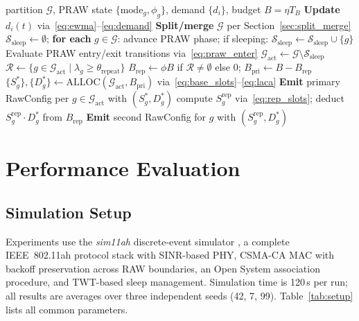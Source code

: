 \documentclass[conference]{IEEEtran}
\begin{document}
\begin{algorithm}[!t]
\caption{TRAW: per-beacon adaptation}
\label{alg:traw}
\begin{algorithmic}[1]
\Require partition $\mathcal{G}$, PRAW state $\{\mathrm{mode}_g, \phi_g\}$,
         demand $\{d_i\}$, budget $B\!=\!\eta T_B$
\State \textbf{Update} $d_i(t)$ via~\eqref{eq:ewma}--\eqref{eq:demand}
\State \textbf{Split/merge} $\mathcal{G}$ per Section~\ref{sec:split_merge}
\State $\mathcal{S}_\mathrm{sleep}\!\leftarrow\!\emptyset$;
  \textbf{for each} $g\in\mathcal{G}$:
  advance PRAW phase; if sleeping: $\mathcal{S}_\mathrm{sleep}\!\leftarrow\!\mathcal{S}_\mathrm{sleep}\cup\{g\}$
\State Evaluate PRAW entry/exit transitions via~\eqref{eq:praw_enter}
\State $\mathcal{G}_\mathrm{act}\!\leftarrow\!\mathcal{G}\setminus\mathcal{S}_\mathrm{sleep}$
\State $\mathcal{R}\!\leftarrow\!\{g\!\in\!\mathcal{G}_\mathrm{act}\mid\lambda_g\!\geq\!\theta_\mathrm{repeat}\}$
\State $B_\mathrm{rep}\!\leftarrow\!\phi B$ if $\mathcal{R}\!\neq\!\emptyset$ else $0$;
       $B_\mathrm{pri}\!\leftarrow\!B - B_\mathrm{rep}$
\State $\{S_g^*\},\{D_g^*\}\!\leftarrow\!\mathrm{ALLOC}(\mathcal{G}_\mathrm{act}, B_\mathrm{pri})$
  via~\eqref{eq:base_slots}--\eqref{eq:laca}
\State \textbf{Emit} primary RawConfig per $g\!\in\!\mathcal{G}_\mathrm{act}$
       with $(S_g^*, D_g^*)$
  \State compute $S_g^\mathrm{rep}$ via~\eqref{eq:rep_slots};
         deduct $S_g^\mathrm{rep}\cdot D_g^*$ from $B_\mathrm{rep}$
  \State \textbf{Emit} second RawConfig for $g$ with $(S_g^\mathrm{rep}, D_g^*)$
\EndFor
\end{algorithmic}
\end{algorithm}

\section{Performance Evaluation}
\label{sec:eval}

\subsection{Simulation Setup}

Experiments use the \textit{sim11ah} discrete-event simulator
\cite{kalita2025}, a complete IEEE~802.11ah protocol stack with
SINR-based PHY, CSMA-CA MAC with backoff preservation across RAW
boundaries, an Open System association procedure, and TWT-based sleep
management.
Simulation time is 120\,s per run; all results are averages over
three independent seeds (42, 7, 99).
Table~\ref{tab:setup} lists all common parameters.
\end{document}
